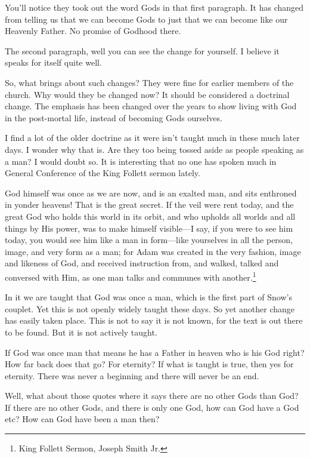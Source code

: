 You'll notice they took out the word Gods in that first paragraph. It has 
changed from telling us that we can become Gods to just that we can become
like our Heavenly Father. No promise of Godhood there.

The second paragraph, well you can see the change for yourself. I believe it 
speaks for itself quite well.

So, what brings about such changes? They were fine for earlier members of the
church. Why would they be changed now? It should be considered a doctrinal 
change. The emphasis has been changed over the years to show living with God 
in the post-mortal life, instead of becoming Gods ourselves.

I find a lot of the older doctrine as it were isn't taught much in these much 
later days. I wonder why that is. Are they too being tossed aside as people 
speaking as a man? I would doubt so. It is interesting that no one has spoken 
much in General Conference of the King Follett sermon lately.

\begin{displayquote}
God himself was once as we are now, and is an exalted man, and sits enthroned 
in yonder heavens! That is the great secret. If the veil were rent today, 
and the great God who holds this world in its orbit, and who upholds all 
worlds and all things by His power, was to make himself visible—I say, if 
you were to see him today, you would see him like a man in form—like yourselves 
in all the person, image, and very form as a man; for Adam was created in the 
very fashion, image and likeness of God, and received instruction from, and 
walked, talked and conversed with Him, as one man talks and communes with 
another.\footnote{King Follett Sermon, Joseph Smith Jr.}
\end{displayquote}

In it we are taught that God was once a man, which is the first part of Snow's 
couplet. Yet this is not openly widely taught these days. So yet another change 
has easily taken place. This is not to say it is not known, for the text is out 
there to be found. But it is not actively taught.

If God was once man that means he has a Father in heaven who is his God right? How
far back does that go? For eternity? If what is taught is true, then yes for
eternity. There was never a beginning and there will never be an end.

Well, what about those quotes where it says there are no other Gods than God? If 
there are no other Gods, and there is only one God, how can God have a God etc? 
How can God have been a man then?